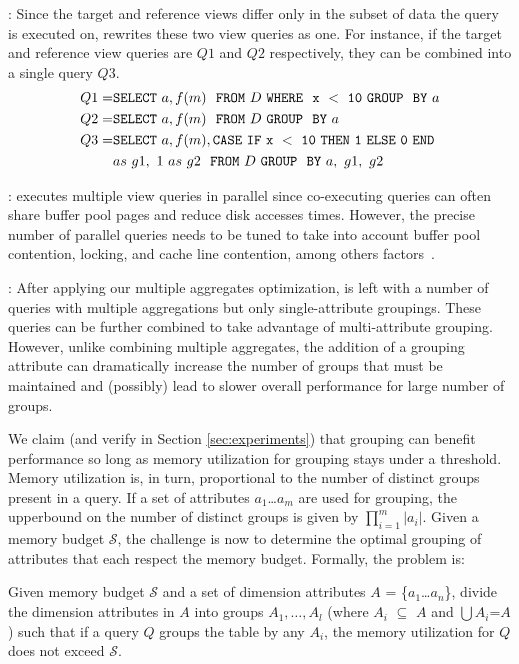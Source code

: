 :
Since the target and reference views differ only in the subset of data
the query is executed on, \SeeDB rewrites these two view queries as
one. For instance, if the target and reference view queries are $Q1$ and $Q2$
respectively, they can be combined into a single query $Q3$.
\vspace{-5pt}
\begin{align*} 
Q1 = &{\tt SELECT \ } a, f(m) \ \ {\tt FROM} \  D\  {\tt WHERE \ \ x\ <\ 10\
GROUP \ \ BY} \ a \\
Q2 = &{\tt SELECT \ } a, f(m) \ \ {\tt FROM} \  D\  {\tt GROUP \ \ BY} \ a \\
Q3 = &{\tt SELECT \ } a, f(m), {\tt CASE\ IF\ x\ <\ 10\ THEN\ 1\ ELSE\ 0\
END}\\ 
&as\ g1,\ 1\ as\ g2 \ \ {\tt FROM} \ D\ {\tt GROUP \ \ BY} \ a,\ g1,\ g2
\end{align*}

:
  \SeeDB executes multiple view queries in parallel since co-executing queries can often
 share buffer pool pages and reduce disk accesses times. 
  However, the precise number of parallel queries needs to be tuned to take into account 
  buffer pool contention, locking, and cache line contention, among others factors~\cite{Postgres_wiki}.  

\stitle {Combine Multiple GROUP BYs}:
After applying our multiple aggregates optimization, \SeeDB is left with a number of 
queries with multiple aggregations but only single-attribute groupings.
These queries can be further combined to take advantage of multi-attribute grouping.
However, unlike combining multiple aggregates, the addition of a grouping attribute can 
dramatically increase the number of groups that must be maintained and (possibly)
lead to slower overall performance for large number of groups.

We claim (and verify in Section \ref{sec:experiments}) that grouping can benefit 
performance so long as memory utilization for grouping stays under a threshold. 
Memory utilization is, in turn, proportional to the number of distinct groups 
present in a query.
If a set of attributes $a_1$\ldots$a_m$ are used for grouping, the upperbound on the 
number of distinct groups is given by $\prod_{i=1}^m |a_i|$. 
Given a memory budget $\mathcal{S}$, the challenge is now to determine the optimal grouping
of attributes that each respect the memory budget. Formally, the problem is:
\vspace{-5pt}
\begin{problem}
Given memory budget $\mathcal{S}$ and a set of dimension attributes $A$ = \{$a_1$\ldots$a_n$\}, 
divide the dimension attributes in $A$ into groups $A_1, \ldots, A_l$ (where $A_i$ $\subseteq$ $A$ 
and $\bigcup A_i$=$A$) such that if a query $Q$ groups the table by any $A_i$, 
the memory utilization for $Q$ does not exceed $\mathcal{S}$.
\vspace{-5pt}
\end{problem}

